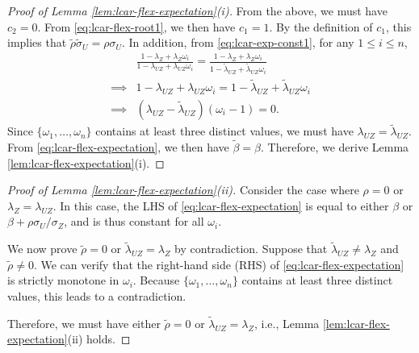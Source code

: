 \documentclass[11pt]{article}
\theoremstyle{definition}
\theoremstyle{remark}
\begin{document}
\begin{proof}[Proof of Lemma \ref{lem:lcar-flex-expectation}(i)]
From the above, we must have $c_2=0$. From \eqref{eq:lcar-flex-root1}, we then have $c_1=1$. 
By the definition of $c_1$, this implies that $\tilde\rho \tilde\sigma_U = \rho\sigma_U$. 
In addition, from \eqref{eq:lcar-exp-const1}, for any $1\le i \le n$, 
\begin{align*}
&\frac{1-\lambda_Z+\lambda_Z \omega_i}{ 1-\lambda_{UZ} + \lambda_{UZ} \omega_i} = \frac{1-\lambda_Z+\lambda_Z \omega_i}{ 1-\tilde\lambda_{UZ} + \tilde\lambda_{UZ} \omega_i}\\
\implies & 1-\lambda_{UZ} + \lambda_{UZ} \omega_i  =  1-\tilde\lambda_{UZ} + \tilde\lambda_{UZ} \omega_i \\
\implies & (\lambda_{UZ} - \tilde\lambda_{UZ})(\omega_i-1) =0.
\end{align*}
Since $\{\omega_1,\ldots,\omega_n\}$ contains at least three distinct values, we must have $\lambda_{UZ} = \tilde\lambda_{UZ}$. 
From \eqref{eq:lcar-flex-expectation}, we then have $\tilde \beta = \beta$. 
Therefore, we derive Lemma \ref{lem:lcar-flex-expectation}(i).
\end{proof}

\begin{proof}[Proof of Lemma \ref{lem:lcar-flex-expectation}(ii)]
Consider the case where $\rho=0$ or $\lambda_Z = \lambda_{UZ}$. In this case, the LHS of \eqref{eq:lcar-flex-expectation} is equal to either $\beta$ or $\beta + \rho\sigma_U/\sigma_Z$, and is thus constant for all $\omega_i$. 

We now prove $\tilde\rho =0$ or $\tilde\lambda_{UZ} = \lambda_Z$ by contradiction. 
Suppose that $\tilde\lambda_{UZ} \neq \lambda_Z$ and $\tilde\rho \neq 0$. We can verify that the right-hand side (RHS) of \eqref{eq:lcar-flex-expectation} is strictly monotone in $\omega_i$. 
Because $\{\omega_1,\ldots,\omega_n\}$ contains at least three distinct values, this leads to a contradiction. 

Therefore, we must have either $\tilde\rho =0$ or $\tilde\lambda_{UZ} = \lambda_Z$, i.e., Lemma \ref{lem:lcar-flex-expectation}(ii) holds. 
\end{proof}
\end{document}
